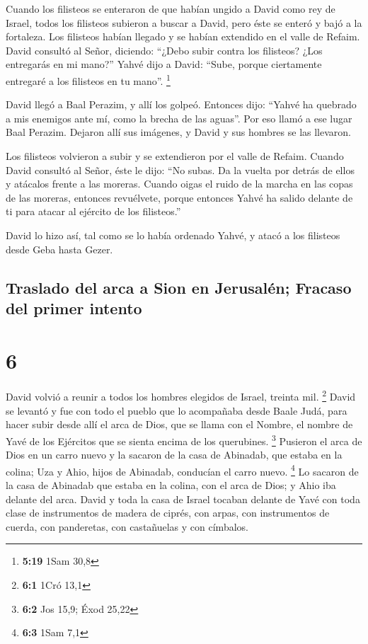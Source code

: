  Cuando los filisteos se enteraron de que habían ungido a
David como rey de Israel, todos los filisteos subieron a buscar a David,
pero éste se enteró y bajó a la fortaleza.  Los filisteos
habían llegado y se habían extendido en el valle de Refaim.
 David consultó al Señor, diciendo: ``¿Debo subir contra
los filisteos? ¿Los entregarás en mi mano?'' Yahvé dijo a David: ``Sube,
porque ciertamente entregaré a los filisteos en tu mano''. \footnote{\textbf{5:19}
  1Sam 30,8}

 David llegó a Baal Perazim, y allí los golpeó. Entonces
dijo: ``Yahvé ha quebrado a mis enemigos ante mí, como la brecha de las
aguas''. Por eso llamó a ese lugar Baal Perazim.  Dejaron
allí sus imágenes, y David y sus hombres se las llevaron.

 Los filisteos volvieron a subir y se extendieron por el
valle de Refaim.  Cuando David consultó al Señor, éste le
dijo: ``No subas. Da la vuelta por detrás de ellos y atácalos frente a
las moreras.  Cuando oigas el ruido de la marcha en las
copas de las moreras, entonces revuélvete, porque entonces Yahvé ha
salido delante de ti para atacar al ejército de los filisteos.''

 David lo hizo así, tal como se lo había ordenado Yahvé,
y atacó a los filisteos desde Geba hasta Gezer.

\hypertarget{traslado-del-arca-a-sion-en-jerusaluxe9n-fracaso-del-primer-intento}{%
\subsection{Traslado del arca a Sion en Jerusalén; Fracaso del primer
intento}\label{traslado-del-arca-a-sion-en-jerusaluxe9n-fracaso-del-primer-intento}}

\hypertarget{section-5}{%
\section{6}\label{section-5}}

 David volvió a reunir a todos los hombres elegidos de
Israel, treinta mil. \footnote{\textbf{6:1} 1Cró 13,1} 
David se levantó y fue con todo el pueblo que lo acompañaba desde Baale
Judá, para hacer subir desde allí el arca de Dios, que se llama con el
Nombre, el nombre de Yavé de los Ejércitos que se sienta encima de los
querubines. \footnote{\textbf{6:2} Jos 15,9; Éxod 25,22} 
Pusieron el arca de Dios en un carro nuevo y la sacaron de la casa de
Abinadab, que estaba en la colina; Uza y Ahio, hijos de Abinadab,
conducían el carro nuevo. \footnote{\textbf{6:3} 1Sam 7,1}
 Lo sacaron de la casa de Abinadab que estaba en la
colina, con el arca de Dios; y Ahio iba delante del arca. 
David y toda la casa de Israel tocaban delante de Yavé con toda clase de
instrumentos de madera de ciprés, con arpas, con instrumentos de cuerda,
con panderetas, con castañuelas y con címbalos.

